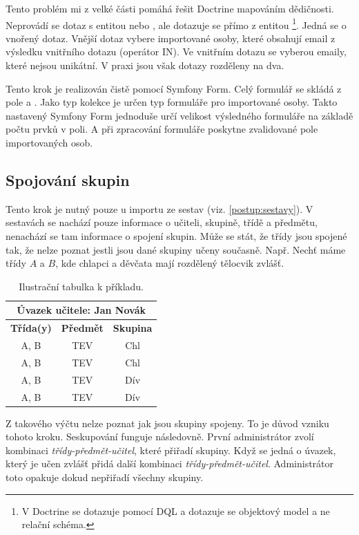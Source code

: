 Tento problém mi z velké části pomáhá řešit Doctrine mapováním dědičnosti.
Neprovádí se dotaz s entitou  nebo , ale dotazuje se přímo z entitou \footnote{V Doctrine se dotazuje pomocí DQL a dotazuje se objektový model a ne relační schéma.}.
Jedná se o vnořený dotaz.
Vnější dotaz vybere importované osoby, které obsahují email z výsledku vnitřního dotazu (operátor \textsc{IN}).
Ve vnitřním dotazu se vyberou emaily, které nejsou unikátní. V praxi jsou však dotazy rozděleny na dva.

Tento krok je realizován čistě pomocí Symfony Form. Celý formulář se skládá z pole  a .
Jako typ kolekce je určen typ formuláře pro importované osoby.
Takto nastavený Symfony Form jednoduše určí velikost výsledného formuláře na základě počtu prvků v poli.
A při zpracování formuláře poskytne zvalidované pole importovaných osob.

\subsection{Spojování skupin}\label{postup:spojovani-skupin}

Tento krok je nutný pouze u importu ze sestav (viz. \ref{postup:sestavy}).
V sestavách se nachází pouze informace o učiteli, skupině, třídě a předmětu, nenachází se tam informace o spojení skupin.
Může se stát, že třídy jsou spojené tak, že nelze poznat jestli jsou dané skupiny učeny současně.
Např. Nechť máme třídy $A$ a $B$, kde chlapci a děvčata mají rozdělený tělocvik zvlášť.

\begin{table}[h!]
\centering
\begin{tabular}{ | c | c | c | }
\hline
 \multicolumn{3}{|c|}{\textbf{Úvazek učitele:} Jan Novák}\\
     \hline
 \textbf{Třída(y)} & \textbf{Předmět} & \textbf{Skupina}\\
 \hline
 A, B & TEV & Chl \\ 
 \hline
 A, B & TEV & Chl \\  
 \hline
 A, B & TEV & Dív \\ 
 \hline
 A, B & TEV & Dív \\  
 \hline
\end{tabular}
\caption{Ilustrační tabulka k příkladu.}
\end{table}

Z takového výčtu nelze poznat jak jsou skupiny spojeny.
To je důvod vzniku tohoto kroku.
Seskupování funguje následovně.
První administrátor zvolí kombinaci \textit{třídy-předmět-učitel}, které přiřadí skupiny. 
Když se jedná o úvazek, který je učen zvlášť přidá další kombinaci \textit{třídy-předmět-učitel}. Administrátor toto opakuje dokud nepřiřadí všechny skupiny.

